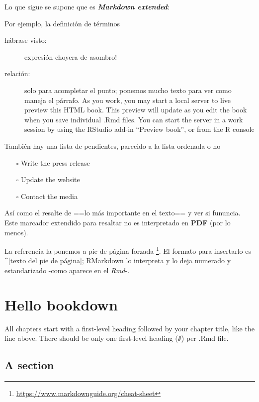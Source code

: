\documentclass[
  12pt,
]{book}
\providecommand{\tightlist}{%
  \setlength{\itemsep}{0pt}\setlength{\parskip}{0pt}}
\theoremstyle{definition}
\theoremstyle{definition}
\theoremstyle{definition}
\theoremstyle{definition}
\theoremstyle{remark}
\begin{document}
Lo que sigue se supone que es \textbf{\emph{Markdown extended}}:

Por ejemplo, la definición de términos

\begin{description}
\item[hábrase visto:]
expresión choyera de asombro!
\item[relación:]
solo para acompletar el punto; ponemos mucho texto para ver como maneja el párrafo. As you work, you may start a local server to live preview this HTML book. This preview will update as you edit the book when you save individual .Rmd files. You can start the server in a work session by using the RStudio add-in ``Preview book'', or from the R console
\end{description}

También hay una lista de pendientes, parecido a la lista ordenada o no

\begin{itemize}
\tightlist
\item[$\square$]
  Write the press release
\item[$\square$]
  Update the website
\item[$\square$]
  Contact the media
\end{itemize}

Así como el resalte de ==lo más importante en el texto== y ver si fununcia. Este marcador extendido para resaltar no es interpretado en \textbf{PDF} (por lo menos).

La referencia la ponemos a pie de página forzada \footnote{\url{https://www.markdownguide.org/cheat-sheet}}. El formato para insertarlo es \^{}{[}texto del pie de página{]}; RMarkdown lo interpreta y lo deja numerado y estandarizado -como aparece en el \emph{Rmd}-.

\hypertarget{hello-bookdown}{%
\chapter{Hello bookdown}\label{hello-bookdown}}

All chapters start with a first-level heading followed by your chapter title, like the line above. There should be only one first-level heading (\texttt{\#}) per .Rmd file.

\hypertarget{a-section}{%
\section{A section}\label{a-section}}
\end{document}
